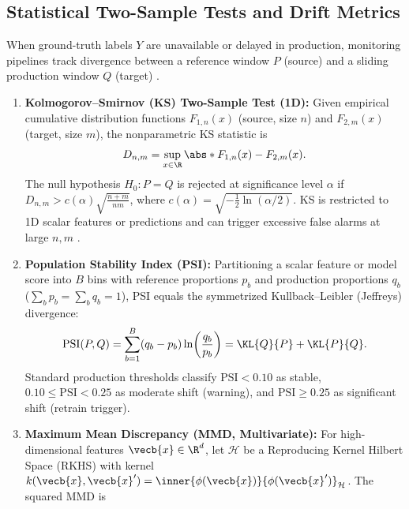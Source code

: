 \documentclass[../../../../master.tex]{subfiles}
\begin{document}
\subsection{Statistical Two-Sample Tests and Drift Metrics}

When ground-truth labels $Y$ are unavailable or delayed in production, monitoring pipelines track divergence between a reference window $P$ (source) and a sliding production window $Q$ (target) .

\begin{coremath}
\begin{enumerate}
  \item \textbf{Kolmogorov--Smirnov (KS) Two-Sample Test (1D):} Given empirical cumulative distribution functions $F_{1,n}(x)$ (source, size $n$) and $F_{2,m}(x)$ (target, size $m$), the nonparametric KS statistic is
  \begin{equation}\label{eq:mlsys:ks_stat}
    D_{n,m} = \sup_{x \in \R} \abs*{F_{1,n}(x) - F_{2,m}(x)}.
  \end{equation}
  The null hypothesis $H_0: P = Q$ is rejected at significance level $\alpha$ if $D_{n,m} > c(\alpha)\sqrt{\frac{n+m}{nm}}$, where $c(\alpha) = \sqrt{-\frac{1}{2}\ln(\alpha/2)}$. KS is restricted to 1D scalar features or predictions and can trigger excessive false alarms at large $n, m$ .
  \item \textbf{Population Stability Index (PSI):} Partitioning a scalar feature or model score into $B$ bins with reference proportions $p_b$ and production proportions $q_b$ ($\sum_b p_b = \sum_b q_b = 1$), PSI equals the symmetrized Kullback--Leibler (Jeffreys) divergence:
  \begin{equation}\label{eq:mlsys:psi}
    \mathrm{PSI}(P, Q) = \sum_{b=1}^{B} (q_b - p_b)\ln\!\left(\frac{q_b}{p_b}\right) = \KL{Q}{P} + \KL{P}{Q}.
  \end{equation}
  Standard production thresholds classify $\mathrm{PSI} < 0.10$ as stable, $0.10 \le \mathrm{PSI} < 0.25$ as moderate shift (warning), and $\mathrm{PSI} \ge 0.25$ as significant shift (retrain trigger).
  \item \textbf{Maximum Mean Discrepancy (MMD, Multivariate):} For high-dimensional features $\vecb{x} \in \R^d$, let $\mathcal{H}$ be a Reproducing Kernel Hilbert Space (RKHS) with kernel $k(\vecb{x}, \vecb{x}') = \inner{\phi(\vecb{x})}{\phi(\vecb{x}')}_{\mathcal{H}}$. The squared MMD is

\end{enumerate}
\end{coremath}
\end{document}
